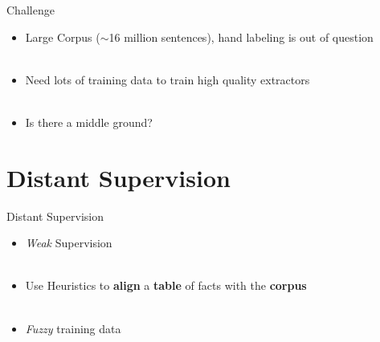 \documentclass{beamer}
\begin{document}
\begin{frame}{Challenge}
 \begin{itemize}
  \item Large Corpus ($\sim$16 million sentences), hand labeling is out of question \pause \\~\\
  \item Need lots of training data to train high quality extractors \pause \\~\\
  \item Is there a middle ground?
 \end{itemize}
\end{frame}

\section{Distant Supervision}
\begin{frame}{Distant Supervision} \pause 
\begin{itemize}
 
 \item  \emph{Weak} Supervision\pause \\~\\
  \item Use Heuristics to \textbf{align} a \textbf{table} of facts with the \textbf{corpus}  \pause \\~\\
  \item \emph{Fuzzy} training data 
  
\end{itemize}
\end{frame}
\end{document}

